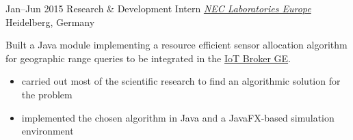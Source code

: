 \begin{entrylist}
\entry
{Jan--Jun 2015}
{Research \& Development Intern {\normalfont \emph{\href{https://uk.nec.com/}{NEC Laboratories Europe}}}}
{Heidelberg, Germany}
{Built a Java module implementing a resource efficient sensor allocation algorithm for geographic range queries to be integrated in the \href{https://github.com/Aeronbroker/Aeron}{IoT Broker GE}.
\vspace{-.2cm}
\begin{itemize}[leftmargin=.6cm]
	\item carried out most of the scientific research to find an algorithmic solution for the problem
	\item implemented the chosen algorithm in Java and a JavaFX-based simulation environment
\end{itemize}
}


\end{entrylist}

